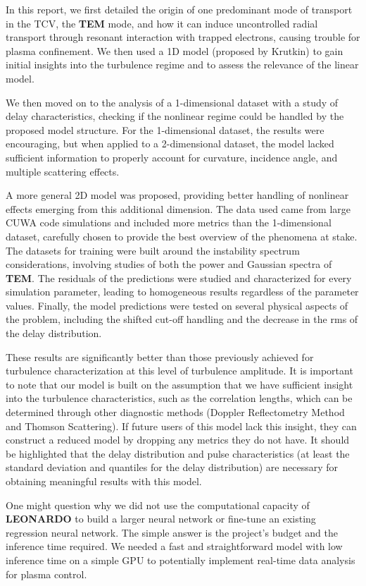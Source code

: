 \documentclass[11pt,a4paper,openany]{report}
\begin{document}
\begin{multicols}{2}
    In this report, we first detailed the origin of one predominant mode of transport in the TCV, the \textbf{TEM} mode, and how it can induce uncontrolled radial transport through resonant interaction with trapped electrons, causing trouble for plasma confinement. We then used a 1D model (proposed by Krutkin) to gain initial insights into the turbulence regime and to assess the relevance of the linear model.

    We then moved on to the analysis of a 1-dimensional dataset with a study of delay characteristics, checking if the nonlinear regime could be handled by the proposed model structure. For the 1-dimensional dataset, the results were encouraging, but when applied to a 2-dimensional dataset, the model lacked sufficient information to properly account for curvature, incidence angle, and multiple scattering effects.

    A more general 2D model was proposed, providing better handling of nonlinear effects emerging from this additional dimension. The data used came from large CUWA code simulations and included more metrics than the 1-dimensional dataset, carefully chosen to provide the best overview of the phenomena at stake. The datasets for training were built around the instability spectrum considerations, involving studies of both the power and Gaussian spectra of \textbf{TEM}. The residuals of the predictions were studied and characterized for every simulation parameter, leading to homogeneous results regardless of the parameter values. Finally, the model predictions were tested on several physical aspects of the problem, including the shifted cut-off handling and the decrease in the rms of the delay distribution.

    These results are significantly better than those previously achieved for turbulence characterization at this level of turbulence amplitude. It is important to note that our model is built on the assumption that we have sufficient insight into the turbulence characteristics, such as the correlation lengths, which can be determined through other diagnostic methods (Doppler Reflectometry Method and Thomson Scattering). If future users of this model lack this insight, they can construct a reduced model by dropping any metrics they do not have. It should be highlighted that the delay distribution and pulse characteristics (at least the standard deviation and quantiles for the delay distribution) are necessary for obtaining meaningful results with this model.

    One might question why we did not use the computational capacity of \textbf{LEONARDO} to build a larger neural network or fine-tune an existing regression neural network. The simple answer is the project's budget and the inference time required. We needed a fast and straightforward model with low inference time on a simple GPU to potentially implement real-time data analysis for plasma control.


\end{multicols}
\end{document}
